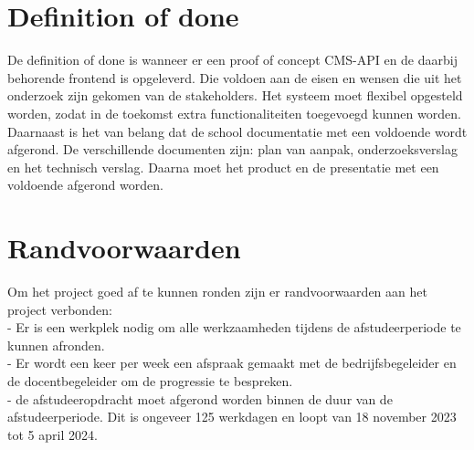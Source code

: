 \whitespace[2]
\section{Definition of done}
De definition of done is wanneer er een proof of concept \gls{CMS}-API en de daarbij behorende frontend is opgeleverd. 
Die voldoen aan de  eisen en wensen die uit het onderzoek zijn gekomen van de stakeholders.
Het systeem moet flexibel opgesteld worden, zodat in de toekomst extra functionaliteiten toegevoegd kunnen worden.
Daarnaast is het van belang dat de school documentatie met een voldoende wordt afgerond.
De verschillende documenten zijn: plan van aanpak, onderzoeksverslag en het technisch verslag.
Daarna moet het product en de presentatie met een voldoende afgerond worden.
\section{Randvoorwaarden}
Om het project goed af te kunnen ronden zijn er randvoorwaarden aan het project verbonden: \\
- Er is een werkplek nodig om alle werkzaamheden tijdens de afstudeerperiode te kunnen afronden.\\
- Er wordt een keer per week een afspraak gemaakt met de bedrijfsbegeleider en de docentbegeleider om de progressie te bespreken. \\ 
- de afstudeeropdracht moet afgerond worden binnen de duur van de afstudeerperiode. 
Dit is ongeveer 125 werkdagen en loopt van 18 november 2023 tot 5 april 2024.
